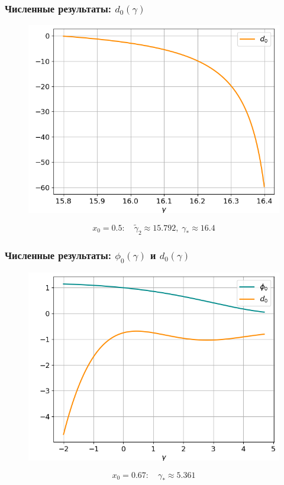 \documentclass[fullscreen=true, unicode, bookmarks=false]{beamer}
\begin{document}
\begin{frame}
\frametitle{ Численные результаты: $ d_0(\gamma) $ }

\begin{figure} 
\includegraphics[scale=0.55]{divergent_d0_12_3.png}  
\end{figure}

$$ x_0 = 0.5: \quad \tilde{\gamma}_2 \approx 15.792, \; \gamma_* \approx 16.4 $$

\end{frame}

\begin{frame}
\frametitle{ Численные результаты: $ \phi_0(\gamma) $ и $ d_0(\gamma) $ }

\begin{figure} 
\includegraphics[scale=0.55]{divergent_phi0d0_23.png}  
\end{figure}

$$ x_0 = 0.67: \quad \gamma_* \approx 5.361 $$

\end{frame}
\end{document}
